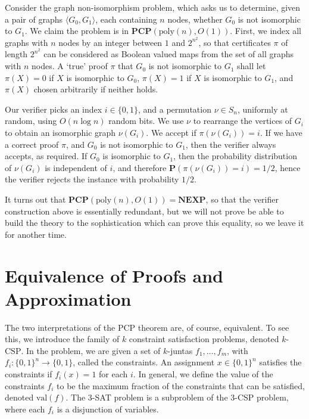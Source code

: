 \begin{example}
    Consider the graph non-isomorphism problem, which asks us to determine, given a pair of graphs $\langle G_0, G_1 \rangle$, each containing $n$ nodes, whether $G_0$ is not isomorphic to $G_1$. We claim the problem is in $\mathbf{PCP}(\text{poly}(n),O(1))$. First, we index all graphs with $n$ nodes by an integer between $1$ and $2^{n^2}$, so that certificates $\pi$ of length $2^{n^2}$ can be considered as Boolean valued maps from the set of all graphs with $n$ nodes. A `true' proof $\pi$ that $G_0$ is not isomorphic to $G_1$ shall let $\pi(X) = 0$ if $X$ is isomorphic to $G_0$, $\pi(X) = 1$ if $X$ is isomorphic to $G_1$, and $\pi(X)$ chosen arbitrarily if neither holds.

    Our verifier picks an index $i \in \{ 0,1 \}$, and a permutation $\nu \in S_n$, uniformly at random, using $O(n \log n)$ random bits. We use $\nu$ to rearrange the vertices of $G_i$ to obtain an isomorphic graph $\nu(G_i)$. We accept if $\pi(\nu(G_i)) = i$. If we have a correct proof $\pi$, and $G_0$ is not isomorphic to $G_1$, then the verifier always accepts, as required. If $G_0$ is isomorphic to $G_1$, then the probability distribution of $\nu(G_i)$ is independent of $i$, and therefore $\mathbf{P}(\pi(\nu(G_i)) = i) = 1/2$, hence the verifier rejects the instance with probability $1/2$.
\end{example}

It turns out that $\mathbf{PCP}(\text{poly}(n), O(1)) = \mathbf{NEXP}$, so that the verifier construction above is essentially redundant, but we will not prove be able to build the theory to the sophistication which can prove this equality, so we leave it for another time.

\section{Equivalence of Proofs and Approximation}

The two interpretations of the PCP theorem are, of course, equivalent. To see this, we introduce the family of $k$ constraint satisfaction problems, denoted $k$-$\text{CSP}$. In the problem, we are given a set of $k$-juntas $f_1, \dots, f_m$, with $f_i: \{ 0,1 \}^n \to \{ 0,1 \}$, called the constraints. An assignment $x \in \{ 0, 1 \}^n$ satisfies the constraints if $f_i(x) = 1$ for each $i$. In general, we define the value of the constraints $f_i$ to be the maximum fraction of the constraints that can be satisfied, denoted $\text{val}(f)$. The 3-SAT problem is a subproblem of the 3-CSP problem, where each $f_i$ is a disjunction of variables.

